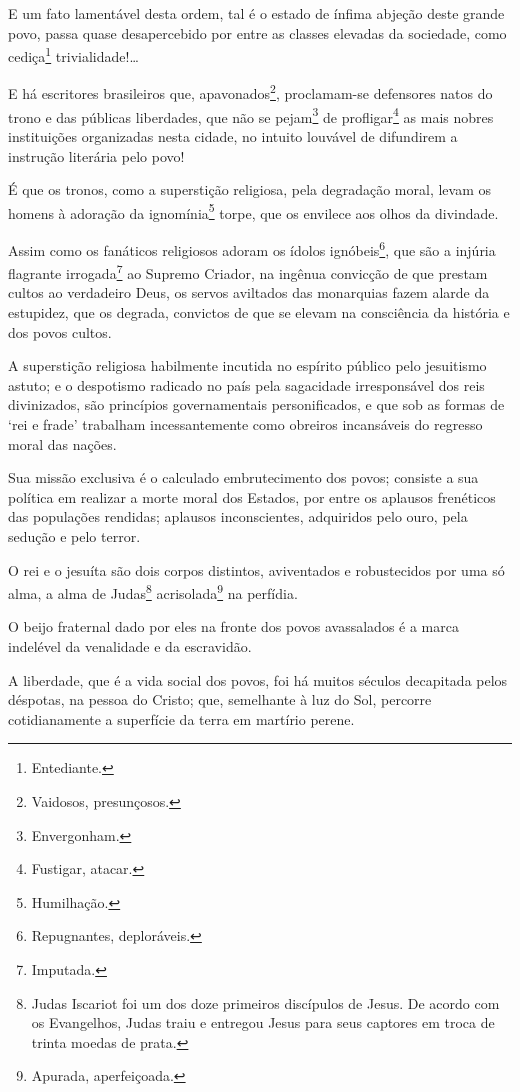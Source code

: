 E um fato lamentável desta ordem, tal é o estado de ínfima abjeção deste
grande povo, passa quase desapercebido por entre as classes elevadas da
sociedade, como cediça\footnote{Entediante.} trivialidade!\ldots

E há escritores brasileiros que, apavonados\footnote{Vaidosos,
  presunçosos.}, proclamam-se defensores natos do trono e das públicas
liberdades, que não se pejam\footnote{Envergonham.} de
profligar\footnote{Fustigar, atacar.} as mais nobres instituições
organizadas nesta cidade, no intuito louvável de difundirem a instrução
literária pelo povo!

É que os tronos, como a superstição religiosa, pela degradação moral,
levam os homens à adoração da ignomínia\footnote{Humilhação.} torpe,
que os envilece aos olhos da divindade.

Assim como os fanáticos religiosos adoram os ídolos ignóbeis\footnote{
  Repugnantes, deploráveis.}, que são a injúria flagrante
irrogada\footnote{Imputada.} ao Supremo Criador, na ingênua convicção
de que prestam cultos ao verdadeiro Deus, os servos aviltados das
monarquias fazem alarde da estupidez, que os degrada, convictos de que
se elevam na consciência da história e dos povos cultos.

A superstição religiosa habilmente incutida no espírito público pelo
jesuitismo astuto; e o despotismo radicado no país pela sagacidade
irresponsável dos reis divinizados, são princípios governamentais
personificados, e que sob as formas de `rei e frade' trabalham
incessantemente como obreiros incansáveis do regresso moral das nações.

Sua missão exclusiva é o calculado embrutecimento dos povos; consiste a
sua política em realizar a morte moral dos Estados, por entre os
aplausos frenéticos das populações rendidas; aplausos inconscientes,
adquiridos pelo ouro, pela sedução e pelo terror.

O rei e o jesuíta são dois corpos distintos, aviventados e robustecidos
por uma só alma, a alma de Judas\footnote{Judas Iscariot foi um dos
  doze primeiros discípulos de Jesus. De acordo com os Evangelhos, Judas
  traiu e entregou Jesus para seus captores em troca de trinta moedas de
  prata.\label{judas}} acrisolada\footnote{Apurada, aperfeiçoada.} na perfídia.

O beijo fraternal dado por eles na fronte dos povos avassalados é a
marca indelével da venalidade e da escravidão.

A liberdade, que é a vida social dos povos, foi há muitos séculos
decapitada pelos déspotas, na pessoa do Cristo; que, semelhante à luz do
Sol, percorre cotidianamente a superfície da terra em martírio perene.

